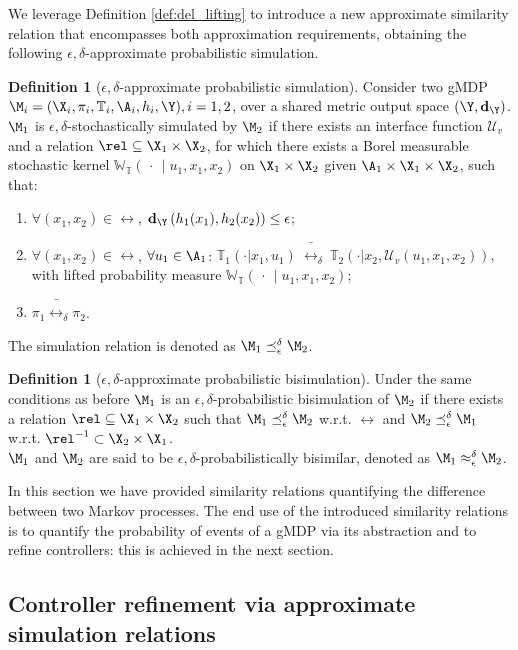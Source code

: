 \documentclass[letterpaper, 10 pt, conference]{amsart}
\theoremstyle{definition}
\newtheorem{defn}[definition]{Definition}
\theoremstyle{example}
\theoremstyle{remark}
\newcommand{\eps}{\epsilon}
\newcommand{\InF}{\mathcal{U}_{v}}
\newcommand{\Wt}{\mathbb{W}_{\mathbb{T}}}
\begin{document}
We leverage Definition \ref{def:del_lifting} to introduce a new approximate similarity relation that encompasses both approximation requirements, 
obtaining the following $\eps,\delta$-approximate probabilistic simulation. 
\begin{defn}[$\eps,\delta$-approximate probabilistic simulation]\label{def:apbsim}
Consider two gMDP $\M_i=(\X_i,\pi_i ,\mathbb T_i,\A_i,h_i,\Y), i =1,2$,  over a shared {metric} output space  $(\Y,\mathbf{d}_\Y)$.  
$\M_1$ is $\epsilon,\delta$-stochastically simulated by $\M_2$ if there exists an interface function $\InF$ and
a relation $\rel\subseteq \X_1\times \X_2$, for which there exists a Borel measurable stochastic kernel $\Wt(\,\cdot\,{\mid} u_1,x_1,x_2)$ on $\X_1\times\X_2$ given $\A_1\times\X_1\times\X_2$,
such that: 
{ \setlength{\parskip}{-2pt}\setlength{\parsep}{-1pt}
\begin{enumerate}
\item $\forall (x_1,x_2)\in \rel$, $ \mathbf{d}_\Y\left(h_1(x_1),h_2(x_2)\right)\leq \epsilon$;
\item $\forall (x_1,x_2)\in \rel$, $\forall u_1\in\A_1$:  
\(\mathbb T_1(\cdot| x_1, u_1)\ \bar \rel_\delta \  \mathbb T_2(\cdot| x_2, \InF(u_1,x_1,x_2)),\) with lifted probability measure $\Wt(\,\cdot\,{\mid}u_1,x_1,x_2)$; 
\item $\pi_1\bar \rel_\delta \pi_2$.
\end{enumerate} }
\noindent The simulation relation is denoted as $\M_1\preceq^{\delta}_\eps\M_2$.  
\end{defn}
\begin{defn}[$\eps,\delta$-approximate probabilistic bisimulation]\label{def:apbbi}
Under the same conditions as before  $\M_1$ is an $\epsilon,\delta$-probabilistic bisimulation of $\M_2$ if there exists 
a relation $\rel \subseteq \X_1\times \X_2$ such that
$\M_1\preceq_\eps^{\delta}\M_2$ w.r.t. $\rel$ and $\M_2\preceq_\eps^{\delta}\M_1$ w.r.t. $\rel^{-1}\subset \X_2\times \X_1$. \\
\noindent$\M_1$ and $\M_2$ are said to be $\eps,\delta$-probabilistically bisimilar, denoted as $\M_1\approx^\delta_\eps\M_2$.  
\end{defn}
In this section we have provided similarity relations quantifying the difference between two Markov processes. 
The end use of the introduced similarity relations is to quantify the probability of events of a gMDP via its abstraction and to refine controllers: 
this is achieved in the next section.  

\subsection{Controller refinement via approximate 
simulation relations}\label{sec:control}
\end{document}
